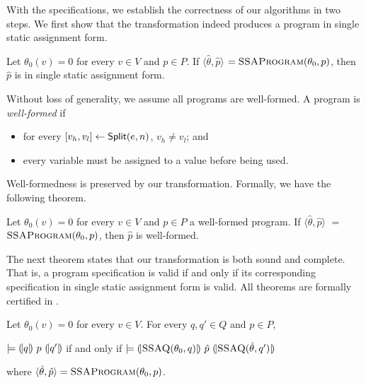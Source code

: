 With the \coq specifications, we establish the correctness of our
algorithms in two steps. We first show that the transformation indeed
produces a program in single static assignment form.
\begin{theorem}
  Let $\theta_0(v) = 0$ for every $v \in V$ and $p \in P$.
  If $\langle \hat{\theta}, \hat{p} \rangle$ $=
  \textsc{SSAProgram}(\theta_0, p)$, then 
  $\hat{p}$ is in single static assignment form.
\end{theorem}

Without loss of generality, we assume all programs are well-formed. 
A program is \emph{well-formed} if
\begin{itemize}
\item for every ${[}{v_h}, {v_l}{]} \leftarrow \mbox{\textsf{Split}}(e, n)$, $v_h
  \neq v_l$; and
\item every variable must be assigned to a value before being used.
\end{itemize}
Well-formedness is preserved by our transformation. Formally, we have
the following theorem.
\begin{theorem}
  Let $\theta_0(v) = 0$ for every $v \in V$ and $p \in P$ a
  well-formed program. If $\langle \hat{\theta}, \hat{p} \rangle$ $=$ 
  $\textsc{SSAProgram}(\theta_0, p)$, then $\hat{p}$ is well-formed.
\end{theorem}

The next theorem states that our transformation is both sound and
complete. That is, a program specification is valid if and only if its
corresponding specification in single static assignment form is valid.
All theorems are formally certified in \coq. 
\begin{theorem}
  Let $\theta_0(v) = 0$ for every $v \in V$. For every $q, q' \in Q$
  and $p \in P$,
  \begin{center}
    $\models {(\!|}{q}{|\!)}~{p}~{(\!|}{q'}{|\!)}$ if and only if
    $\models {(\!|}{\textsc{SSAQ}(\theta_0, q)}{|\!)}~{\hat{p}}~{(\!|}{\textsc{SSAQ}(\hat{\theta}, q')}{|\!)}$
  \end{center}
  where $\langle \hat{\theta}, \hat{p} \rangle =
  \textsc{SSAProgram}(\theta_0, p)$.
  \label{theorem:ssa}
\end{theorem}

